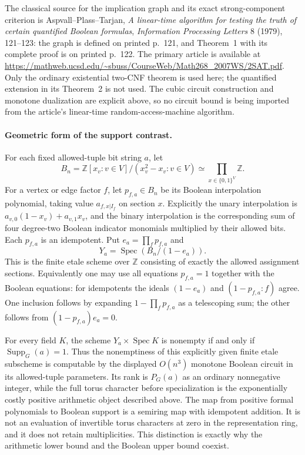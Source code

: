 The classical source for the implication graph and its exact
strong-component criterion is Aspvall--Plass--Tarjan,
\emph{A linear-time algorithm for testing the truth of certain
quantified Boolean formulas}, \emph{Information Processing Letters}
8 (1979), 121--123: the graph is defined on printed p.~121, and
Theorem~1 with its complete proof is on printed p.~122.
The primary article is available at
\url{https://mathweb.ucsd.edu/~sbuss/CourseWeb/Math268_2007WS/2SAT.pdf}.
Only the ordinary existential two-CNF theorem is used here; the
quantified extension in its Theorem~2 is not used.  The cubic circuit
construction and monotone dualization are explicit above, so no
circuit bound is being imported from the article's
linear-time random-access-machine algorithm.

\paragraph{Geometric form of the support contrast.}
For each fixed allowed-tuple bit string $a$, let
\[
 B_n=\mathbb Z[x_v:v\in V]/(x_v^2-x_v:v\in V)
                   \simeq\prod_{x\in\{0,1\}^V}\mathbb Z.
\]
For a vertex or edge factor $f$, let $p_{f,a}\in B_n$ be its
Boolean interpolation polynomial, taking value $a_{f,x|I_f}$
on section $x$.  Explicitly the unary interpolation is
$a_{v,0}(1-x_v)+a_{v,1}x_v$, and the binary interpolation is
the corresponding sum of four degree-two Boolean indicator
monomials multiplied by their allowed bits.  Each $p_{f,a}$
is an idempotent.  Put $e_a=\prod_f p_{f,a}$ and
\[
                 Y_a=\operatorname{Spec}(B_n/(1-e_a)).
\]
This is the finite etale scheme over $\mathbb Z$ consisting of
exactly the allowed assignment sections.  Equivalently one may
use all equations $p_{f,a}=1$ together with the Boolean equations:
for idempotents the ideals $(1-e_a)$ and $(1-p_{f,a}:f)$ agree.
One inclusion follows by expanding $1-\prod_f p_{f,a}$ as a
telescoping sum; the other follows from
$(1-p_{f,a})e_a=0$.

For every field $K$, the scheme $Y_a\times\operatorname{Spec}K$
is nonempty if and only if $\operatorname{Supp}_G(a)=1$.
Thus the nonemptiness of this explicitly given finite etale
subscheme is computable by the displayed $O(n^3)$ monotone
Boolean circuit in its allowed-tuple parameters.  Its rank is
$P_G(a)$ as an ordinary nonnegative integer, while the full
torus character before specialization is the exponentially
costly positive arithmetic object described above.  The map
from positive formal polynomials to Boolean support is a
semiring map with idempotent addition.  It is not an evaluation
of invertible torus characters at zero in the representation
ring, and it does not retain multiplicities.  This distinction
is exactly why the arithmetic lower bound and the Boolean
upper bound coexist.
